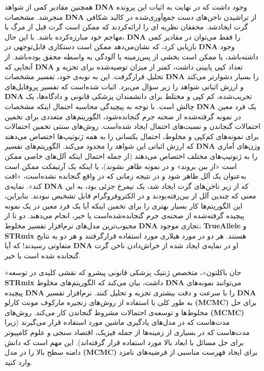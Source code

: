 همچنین مقادیر کمی از شواهد \textenglish{\textbf{DNA}} وجود داشت که در نهایت به اثبات این پرونده منجر‌شد.
مشخصات \textenglish{\textbf{DNA}} از تراشیدن ناخن‌های دست جمع‌آوری‌شده در کالبد شکافی گرت ایجاد‌شد.
محققان نظریه ای را ارائه‌کردند که ممکن است گرت قبل از مرگ با مهاجم خود مبارزه‌کرده باشد.
با این حال، \textenglish{\textbf{DNA}} را فقط می‌توان در مقادیر کمی بازیابی کرد، که نشان‌می‌دهد ممکن است دستکاری قابل‌توجهی در \textenglish{\textbf{DNA}} وجود داشته‌باشد، یا ممکن است بخشی از پس‌زمینه یا آلودگی به واسطه محقق بوده‌باشد.
از آنجایی که \textenglish{\textbf{DNA}} تعداد کپی پایینی داشت، کمتر از میزان توصیه‌شده برای تجزیه و تحلیل قرار‌گرفت.
این به نوبه‌ی خود، تفسیر مشخصات \textenglish{\textbf{DNA}} را بسیار دشوارتر می‌کند و ارزش اثباتی شواهد را زیر سؤال می‌برد.
اثبات شده‌است که تفسیر پروفایل‌های \textenglish{\textbf{DNA}} تخریب‌شده، کم کپی و مختلط برای دانشمندان پزشکی قانونی و دادگاه‌ها، یک چالش است.
با توجه به پیچیدگی محاسبه احتمال اینکه مشخصات \textenglish{\textbf{DNA}} یک فرد معین در نمونه گرفته‌شده از صحنه جرم گنجانده‌شود، الگوریتم‌های متعددی برای تخمین احتمالات گنجاندن و نسبت‌های احتمال ایجاد شده‌است.
روش‌های سنتی تخمین احتمالات برای نمونه‌های کم‌کپی و مخلوط، احتمال یکسانی را به همه ژنوتیپ‌ها اختصاص می‌دهند که ارزش اثباتی این شواهد را محدود می‌کند.
الگوریتم‌های تفسیر \textenglish{\textbf{DNA}} وزن‌های آماری را به ژنوتیپ‌های مختلف اختصاص می‌دهند (از جمله احتمال اینکه آلل‌های خاصی ممکن است «از بین بروند» و در نمونه ظاهر نشوند)، یا اینکه یک آرتیفکت ممکن است به‌عنوان یک آلل ظاهر شود و در نتیجه زمانی که در واقع گنجانده نشده‌است، «افت کند».
نمایه‌ی \textenglish{\textbf{DNA}} که از زیر ناخن‌های گرت ایجاد شد، یک نیمرخ جزئی بود، به این معنی که چندین آلل از بین‌رفته‌بودند و در الکتروفروگرام قابل تشخیص نبودند.
بنابراین، این الگوریتم‌ها کار بسیار بهتری را برای تخمین اینکه آیا یک فرد معین در یک نمونه پیچیده گرفته‌شده از صحنه‌ی جرم گنجانده‌شده‌است یا خیر، انجام می‌دهند.
دو تا از محبوب‌ترین مدل‌های نرم‌افزار تفسیر مخلوط \textenglish{\textbf{DNA}} تجاری موجود، \textenglish{\textbf{TrueAllele}} و \textenglish{\textbf{STRmix}} هستند.
هر دو در مورد هیلاری مورد استفاده قرار‌گرفتند و هر دو به نتایج متفاوتی رسیدند!
که آیا \textenglish{\textbf{DNA}} او در نمایه‌ی ایجاد شده از خراش‌دادن ناخن گرت گنجانده شده است یا خیر.

«جان باکلتون»، متخصص ژنتیک پزشکی قانونی پیشرو که نقشی کلیدی در توسعه \textenglish{\textbf{STRmix}} داشت، بیان می‌کند که الگوریتم‌های مخلوط \textenglish{\textbf{DNA}} می‌توانند نمونه‌های پیچیده \textenglish{\textbf{DNA}} را با سرعت و دقت بیشتری تجزیه و تحلیل کنند.
نرم‌افزار تفسیر \textenglish{\textbf{DNA}} به طور کلی با استفاده از روش‌های زنجیره مارکوف مونت کارلو \textenglish{\textbf{(MCMC)}} برای حل مخلوط‌ها و توسعه‌ی احتمالات مشروط گنجاندن کار می‌کند.
روش‌های \textenglish{\textbf{(MCMC)}} مدت‌هاست که در مدل‌های یادگیری ماشین مورد استفاده قرار می‌گیرند (زیرا مدت‌هاست که در بسیاری از زمینه‌ها از جمله فیزیک، اقتصاد سنجی و علوم کامپیوتر برای حل مسائل با ابعاد بالا مورد استفاده قرار گرفته‌اند).
این مهم است که دانش دامنه سطح بالا را در مدل \textenglish{\textbf{(MCMC)}} برای ایجاد فهرست مناسبی از فرضیه‌های نامزد وارد کنید.

